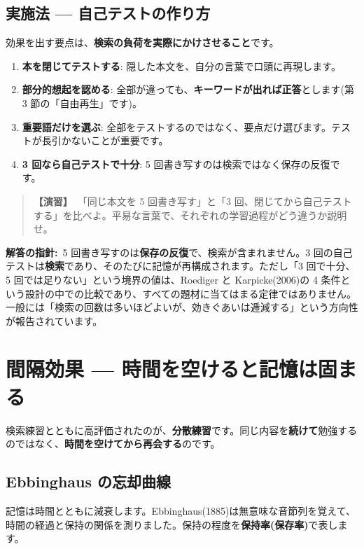 \documentclass{article}
\begin{document}
\subsection{実施法 — 自己テストの作り方}

効果を出す要点は、\textbf{検索の負荷を実際にかけさせること}です。

\begin{enumerate}
\item \textbf{本を閉じてテストする}: 隠した本文を、自分の言葉で口頭に再現します。
\item \textbf{部分的想起を認める}: 全部が違っても、\textbf{キーワードが出れば正答}とします(第 3 節の「自由再生」です)。
\item \textbf{重要語だけを選ぶ}: 全部をテストするのではなく、要点だけ選びます。テストが長引かないことが重要です。
\item \textbf{3 回なら自己テストで十分}: 5 回書き写すのは検索ではなく保存の反復です。
\end{enumerate}

\begin{quote}
\textbf{【演習】}\ 「同じ本文を 5 回書き写す」と「3 回、閉じてから自己テストする」を比べよ。平易な言葉で、それぞれの学習過程がどう違うか説明せ。
\end{quote}

\textbf{解答の指針:}\ 5 回書き写すのは\textbf{保存の反復}で、検索が含まれません。3 回の自己テストは\textbf{検索}であり、そのたびに記憶が再構成されます。ただし「3 回で十分、5 回では足りない」という境界の値は、Roediger と Karpicke(2006)の 4 条件という設計の中での比較であり、すべての題材に当てはまる定律ではありません。一般には「検索の回数は多いほどよいが、効きぐあいは逓減する」という方向性が報告されています。

\section{間隔効果 — 時間を空けると記憶は固まる}

検索練習とともに高評価されたのが、\textbf{分散練習}です。同じ内容を\textbf{続けて}勉強するのではなく、\textbf{時間を空けてから再会する}のです。

\subsection{Ebbinghaus の忘却曲線}

記憶は時間とともに減衰します。Ebbinghaus(1885)は無意味な音節列を覚えて、時間の経過と保持の関係を測りました。保持の程度を\textbf{保持率(保存率)}で表します。
\end{document}
